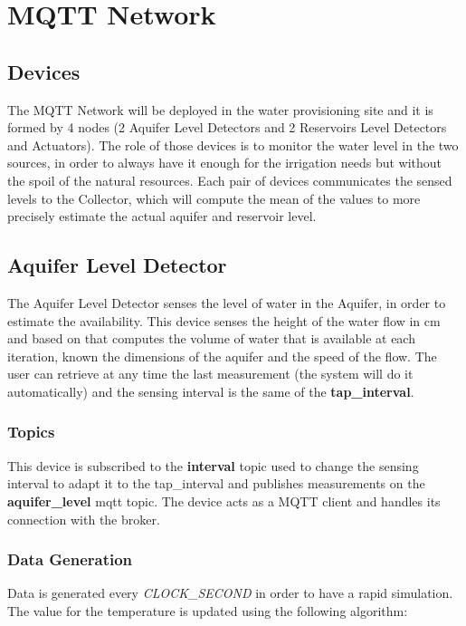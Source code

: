 \section{MQTT Network}

\subsection{Devices}
The MQTT Network will be deployed in the water provisioning site and it is formed by 4 nodes (2 Aquifer Level Detectors and 2 Reservoirs Level Detectors and Actuators). The role of those devices is to monitor the water level in the two sources, in order to always have it enough for the irrigation needs but without the spoil of the natural resources. Each pair of devices communicates the sensed levels  to the Collector, which will compute the mean of the values to more precisely estimate the actual aquifer and reservoir level.


\subsection{Aquifer Level Detector}
The Aquifer Level Detector senses the level of water in the Aquifer, in order to estimate the availability. This device senses the height of the water flow in cm and based on that computes the volume of water that is available at each iteration, known the dimensions of the aquifer and the speed of the flow. The user can retrieve at any time the last measurement (the system will do it automatically) and the sensing interval is the same of the \textbf{tap\_interval}.

\subsubsection{Topics}
This device is subscribed to the \textbf{interval} topic used to change the sensing interval to adapt it to the tap\_interval and publishes measurements on the \textbf{aquifer\_level} mqtt topic.
The device acts as a MQTT client and handles its connection with the broker.

\subsubsection{Data Generation}
Data is generated every \textit{CLOCK\_SECOND} in order to have a rapid simulation. The value for the temperature is updated using the following algorithm:

